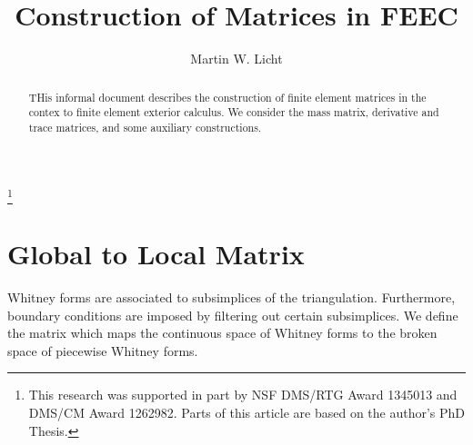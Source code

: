 \documentclass[letterpaper,10pt,draft]{amsart}
\begin{document}
\title
[Bases FEEC]
{Construction of Matrices in FEEC}

\author{Martin W. Licht}

\address{UCSD Department of Mathematics, 9500 Gilman Drive MC0112, La Jolla, CA 92093-0112, USA}


\thanks{
This research was supported in part by NSF DMS/RTG Award 1345013 and DMS/CM Award 1262982.
Parts of this article are based on the author's PhD Thesis.}




\begin{abstract}
 THis informal document describes the construction of finite element matrices 
 in the contex to finite element exterior calculus.
 We consider the mass matrix, derivative and trace matrices,
 and some auxiliary constructions.
\end{abstract}

\maketitle 

\section{Global to Local Matrix}

Whitney forms are associated to subsimplices of the triangulation. 
Furthermore, boundary conditions are imposed by filtering out certain subsimplices.
We define the matrix which maps the continuous space of Whitney forms
to the broken space of piecewise Whitney forms.






  
  

  
\end{document}
